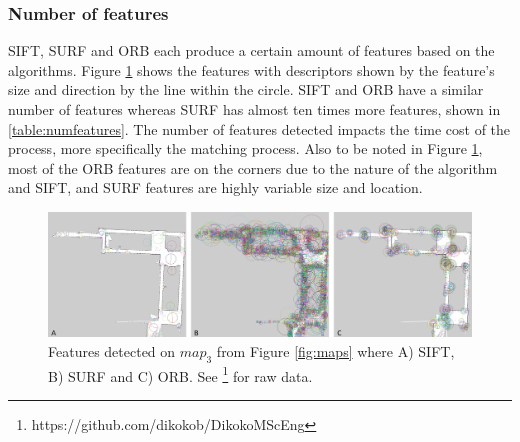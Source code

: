 \subsubsection{Number of features}

SIFT, SURF and ORB each produce a certain amount of features based on the algorithms. Figure \ref{fig:featuremaps} shows the features with descriptors shown by the feature's size and direction by the line within the circle. SIFT and ORB have a similar number of features whereas SURF has almost ten times more features, shown in \ref{table:numfeatures}. The number of features detected impacts the time cost of the process, more specifically the matching process. Also to be noted in Figure \ref{fig:featuremaps}, most of the ORB features are on the corners due to the nature of the algorithm and SIFT, and SURF features are highly variable size and location.

\begin{figure}[H]
    \centering
    \includegraphics[width=1\textwidth]{figs/feature_maps.png}
    \caption[Features detected on map3]{Features detected on $map_3$ from Figure \ref{fig:maps} where A) SIFT, B) SURF and C) ORB. See \footnote{https://github.com/dikokob/DikokoMScEng} for raw data. }
    \label{fig:featuremaps}
\end{figure}


